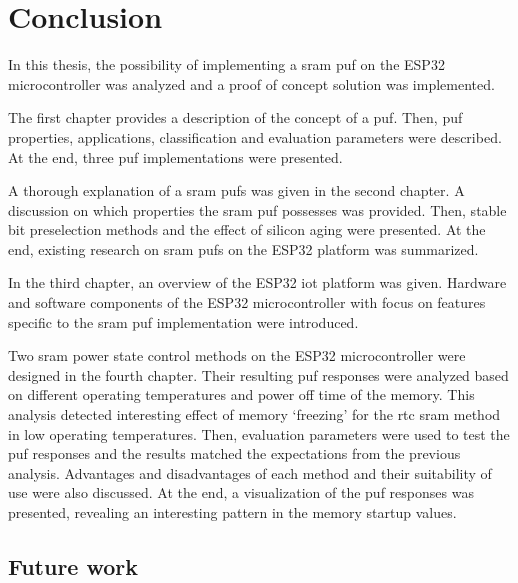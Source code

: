 \chapter*{Conclusion}\label{sec:conclusion}
{}

In this thesis, the possibility of implementing a \gls{sram} \gls{puf} on the ESP32 microcontroller was analyzed and a proof of concept solution was implemented. 

The first chapter provides a description of the concept of a \gls{puf}. Then, \gls{puf} properties, applications, classification and evaluation parameters were described. At the end, three \gls{puf} implementations were presented.

A thorough explanation of a \gls{sram} \glspl{puf} was given in the second chapter. A discussion on which properties the \gls{sram} \gls{puf} possesses was provided. Then, stable bit preselection methods and the effect of silicon aging were presented. At the end, existing research on \gls{sram} \glspl{puf} on the ESP32 platform was summarized.

In the third chapter, an overview of the ESP32 \gls{iot} platform was given. Hardware and software components of the ESP32 microcontroller with focus on features specific to the \gls{sram} \gls{puf} implementation were introduced.

Two \gls{sram} power state control methods on the ESP32 microcontroller were designed in the fourth chapter. Their resulting \gls{puf} responses were analyzed based on different operating temperatures and power off time of the memory. This analysis detected interesting effect of memory `freezing' for the \gls{rtc} \gls{sram} method in low operating temperatures. Then, evaluation parameters were used to test the \gls{puf} responses and the results matched the expectations from the previous analysis. Advantages and disadvantages of each method and their suitability of use were also discussed. At the end, a visualization of the \gls{puf} responses was presented, revealing an interesting pattern in the memory startup values.




\section*{Future work}
{}


